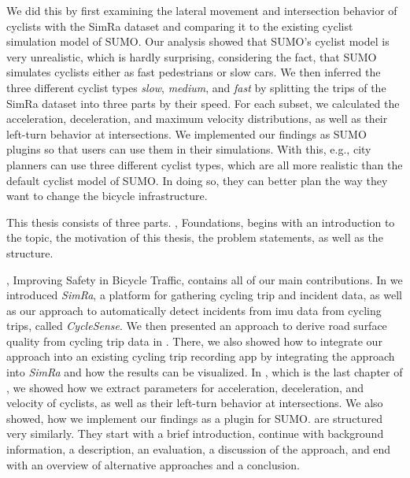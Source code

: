 \begin{itemize}
We did this by first examining the lateral movement and intersection behavior of cyclists with the SimRa dataset and comparing it to the existing cyclist simulation model of SUMO. 
Our analysis showed that SUMO's cyclist model is very unrealistic, which is hardly surprising, considering the fact, that SUMO simulates cyclists either as fast pedestrians or slow cars.
We then inferred the three different cyclist types \textit{slow}, \textit{medium}, and \textit{fast} by splitting  the trips of the SimRa dataset into three parts by their speed.
For each subset, we calculated the acceleration, deceleration, and maximum velocity distributions, as well as their left-turn behavior at intersections.
We implemented our findings as SUMO plugins so that users can use them in their simulations.
With this, e.g., city planners can use three different cyclist types, which are all more realistic than the default cyclist model of SUMO.
In doing so, they can better plan the way they want to change the bicycle infrastructure. 
\end{itemize}

This thesis consists of three parts. , Foundations, begins with an introduction to the topic, the motivation of this thesis, the problem statements, as well as the structure.

, Improving Safety in Bicycle Traffic, contains all of our main contributions.
In  we introduced \textit{SimRa}, a platform for gathering cycling trip and incident data, as well as our approach to automatically detect incidents from \ac{imu} data from cycling trips, called \textit{CycleSense}.
We then presented an approach to derive road surface quality from cycling trip data in .
There, we also showed how to integrate our approach into an existing cycling trip recording app by integrating the approach into \textit{SimRa} and how the results can be visualized.
In , which is the last chapter of , we showed how we extract parameters for acceleration, deceleration, and velocity of cyclists, as well as their left-turn behavior at intersections.
We also showed, how we implement our findings as a plugin for SUMO.
 are structured very similarly.
They start with a brief introduction, continue with background information, a description, an evaluation, a discussion of the approach, and end with an overview of alternative approaches and a conclusion.

